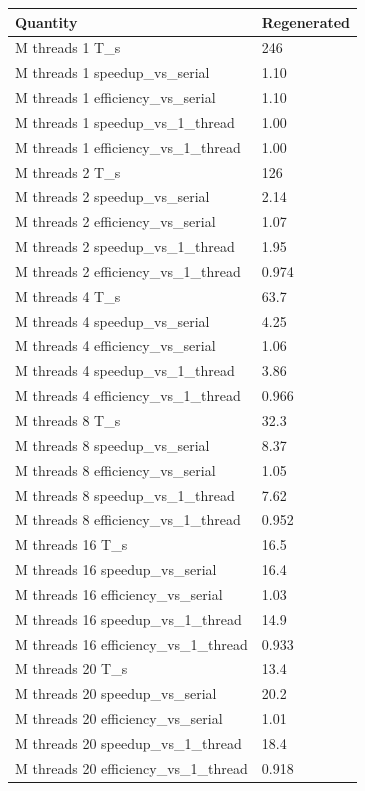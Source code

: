 \begin{tabular}{ll}
Quantity & Regenerated \\
\hline
M threads 1 T\_s & 246 \\
M threads 1 speedup\_vs\_serial & 1.10 \\
M threads 1 efficiency\_vs\_serial & 1.10 \\
M threads 1 speedup\_vs\_1\_thread & 1.00 \\
M threads 1 efficiency\_vs\_1\_thread & 1.00 \\
M threads 2 T\_s & 126 \\
M threads 2 speedup\_vs\_serial & 2.14 \\
M threads 2 efficiency\_vs\_serial & 1.07 \\
M threads 2 speedup\_vs\_1\_thread & 1.95 \\
M threads 2 efficiency\_vs\_1\_thread & 0.974 \\
M threads 4 T\_s & 63.7 \\
M threads 4 speedup\_vs\_serial & 4.25 \\
M threads 4 efficiency\_vs\_serial & 1.06 \\
M threads 4 speedup\_vs\_1\_thread & 3.86 \\
M threads 4 efficiency\_vs\_1\_thread & 0.966 \\
M threads 8 T\_s & 32.3 \\
M threads 8 speedup\_vs\_serial & 8.37 \\
M threads 8 efficiency\_vs\_serial & 1.05 \\
M threads 8 speedup\_vs\_1\_thread & 7.62 \\
M threads 8 efficiency\_vs\_1\_thread & 0.952 \\
M threads 16 T\_s & 16.5 \\
M threads 16 speedup\_vs\_serial & 16.4 \\
M threads 16 efficiency\_vs\_serial & 1.03 \\
M threads 16 speedup\_vs\_1\_thread & 14.9 \\
M threads 16 efficiency\_vs\_1\_thread & 0.933 \\
M threads 20 T\_s & 13.4 \\
M threads 20 speedup\_vs\_serial & 20.2 \\
M threads 20 efficiency\_vs\_serial & 1.01 \\
M threads 20 speedup\_vs\_1\_thread & 18.4 \\
M threads 20 efficiency\_vs\_1\_thread & 0.918 \\

\end{tabular}
